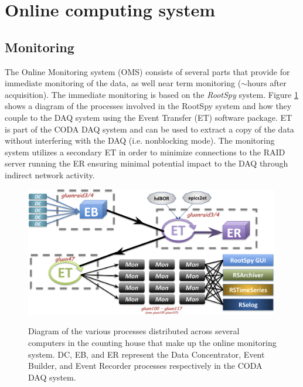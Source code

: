 
\section[Online computing system (David)]{Online computing system \label{sec:online}}
\subsection{Monitoring \label{sec:onlinemonitoring}}

The Online Monitoring system (OMS) consists of several parts that provide for immediate monitoring of the data, as well near term monitoring ($\sim$hours after acquisition). The immediate monitoring is based on the \textit{RootSpy} system. Figure \ref{fig:online_monitoring_processes} shows a diagram of the processes involved in the RootSpy system and how they couple to the DAQ system using the Event Transfer (ET) software package. ET is part of the CODA DAQ system\cite{coda} and can be used to extract a copy of the data without interfering with the DAQ (i.e. nonblocking mode). The monitoring system utilizes a secondary ET in order to minimize connections to the RAID server running the ER ensuring minimal potential impact to the DAQ through indirect network activity.

\begin{figure}[tbp]
\begin{center}
\includegraphics[width=0.99\textwidth]{figures/online_monitoring_processes.png}
\label{fig:online_monitoring_processes}
\caption{Diagram of the various processes distributed across several computers in the counting house that make up the online monitoring system. DC, EB, and ER represent the Data Concentrator, Event Builder, and Event Recorder processes respectively in the CODA DAQ system.}   
\end{center}  
\end{figure}

